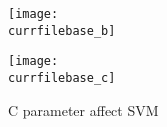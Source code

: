 \documentclass[catalog.tex]{subfiles}
\begin{document}
\begin{figure}[!htb]
	\centering
\texttt{[image: \\currfilebase\_b]}
\end{figure}

\begin{figure}[!htb]
	\centering
\texttt{[image: \\currfilebase\_c]}
	\caption{C parameter affect SVM}
\end{figure}


\singlespacing
\printbibliography[title={References.},resetnumbers=true,heading=subbibliography]
\end{document}
